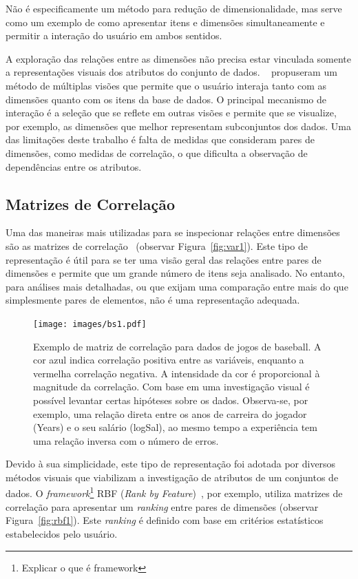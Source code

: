 
Não é especificamente um método para redução de dimensionalidade, mas serve como um exemplo de como apresentar itens e dimensões simultaneamente e permitir a interação do usuário em ambos sentidos.

A exploração das relações entre as dimensões não precisa estar vinculada somente a representações visuais dos atributos do conjunto de dados. \citeauthor{Turkay2011}~\cite{Turkay2011} propuseram um método de múltiplas visões que permite que o usuário interaja tanto com as dimensões quanto com os itens da base de dados. O principal mecanismo de interação é a seleção que se reflete em outras visões e permite que se visualize, por exemplo, as dimensões que melhor representam subconjuntos dos dados. Uma das limitações deste trabalho é falta de medidas que consideram pares de dimensões, como medidas de correlação, o que dificulta a observação de dependências entre os atributos.  

\subsection{Matrizes de Correlação}

Uma das maneiras mais utilizadas para se inspecionar relações entre dimensões são as matrizes de correlação~\cite{Friendly2002} (observar Figura~\ref{fig:var1}). Este tipo de representação é útil para se ter uma visão geral das relações entre pares de dimensões e permite que um grande número de itens seja analisado. No entanto, para análises mais detalhadas, ou que exijam uma comparação entre mais do que simplesmente pares de elementos, não é uma representação adequada.

\begin{figure}[h!]
    \centering
    \texttt{[image: images/bs1.pdf]}
    \caption[Matrizes de Correlação]{Exemplo de matriz de correlação para dados de jogos de baseball. A cor azul indica correlação positiva entre as variáveis, enquanto a vermelha correlação negativa. A intensidade da cor é proporcional à magnitude da correlação. Com base em uma investigação visual é possível levantar certas hipóteses sobre os dados. Observa-se, por exemplo, uma relação direta entre os anos de carreira do jogador (Years) e o seu salário (logSal), ao mesmo tempo a experiência tem uma relação inversa com o número de erros.} 
    \label{fig:bs1}
\end{figure}

Devido à sua simplicidade, este tipo de representação foi adotada por diversos métodos visuais que viabilizam a investigação de atributos de um conjuntos de dados. O \emph{framework}\footnote{Explicar o que é framework} RBF (\emph{Rank by Feature})~\cite{RBF2004}, por exemplo, utiliza matrizes de correlação para apresentar um \emph{ranking} entre pares de dimensões (observar Figura~\ref{fig:rbf1}). Este \emph{ranking} é definido com base em critérios estatísticos estabelecidos pelo usuário. 

